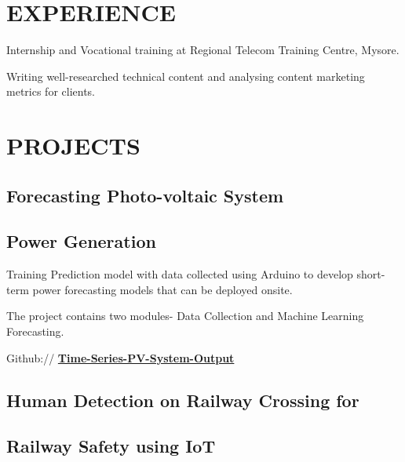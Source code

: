 \documentclass[]{deedy-resume-openfont}
\begin{document}
\begin{minipage}[t]{0.60\textwidth} 


\section{EXPERIENCE}
Internship and Vocational training at Regional Telecom Training Centre, Mysore.\\
\sectionsep

Writing well-researched technical content and 
analysing content marketing metrics for clients.\\
\sectionsep


\section{PROJECTS}
\subsection{Forecasting Photo-voltaic System}
\subsection{Power Generation}


\textbullet{}Training Prediction model with data collected using Arduino to develop short-term power forecasting models that can be deployed onsite.
\sectionsep

\textbullet{}The project contains two modules- Data Collection and Machine Learning Forecasting.
\sectionsep

Github:// \href{https://github.com/Mukunds0507333/Time-Series_PV-System-Output}{\bf Time-Series-PV-System-Output} \\
\sectionsep


\subsection{Human Detection on Railway Crossing for} \subsection{Railway Safety using IoT}


\end{minipage}
\end{document}
